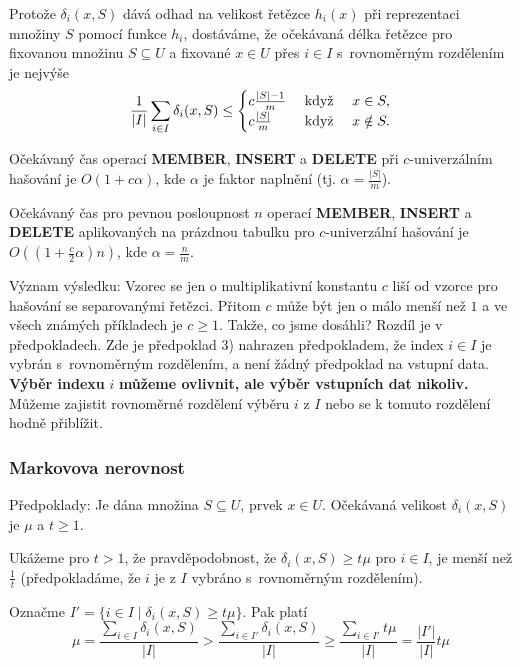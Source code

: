 \documentclass[a4paper,12pt]{article}
\begin{document}
Protože $\delta_i(x,S)$ dává odhad na velikost řetězce $
h_i(x)$ při 
repre\-zentaci množiny $S$ pomocí funkce $h_i$, dostáváme, že 
očekávaná délka řetězce pro fixovanou množinu  
$S\subseteq U$ a fixované $x\in U$ přes $i\in I$ s~rovnoměrným 
rozdělením je nejvýše
$$\frac 1{|I|}\sum_{i\in I}\delta_i(x,S)\le\begin{cases} c\frac {|S|-1}m&\text{\rm\ když }
\quad x\in S,\\
c\frac {|S|}m&\text{\rm\ když }\quad x\notin S.\end{cases} $$

\begin{veta}Očekávaný čas operací {\bf MEMBER}, {\bf INSERT }
a {\bf DE\-LETE} při $c$-univerzálním hašování je $
O(1+c\alpha )$, kde 
$\alpha$ je faktor napl\-nění (tj. $\alpha =\frac {|S|}m$).

Očekávaný čas pro pevnou posloupnost $n$ operací 
{\bf MEMBER}, {\bf INSERT} a {\bf DELETE} aplikovaných na prázdnou ta\-bulku 
pro $c$-univerzální hašování je $O((1+\frac c2\alpha 
)n)$, kde $\alpha =\frac nm$.  
\end{veta}

Význam výsledku:  Vzorec se jen o multiplikativní 
konstantu $c$ liší od vzorce pro hašování se separovanými 
řetězci.  Přitom $c$ může být jen o málo menší než $
1$ a 
ve všech známých příkla\-dech je $c\ge 1$.  Takže, co jsme 
dosáhli?  Rozdíl je v předpokla\-dech.  Zde je předpoklad 3) 
nahrazen předpokladem, že index $i\in I$ je vybrán s~rovnoměrným rozdělením, a není žádný předpoklad na vstupní 
data.  {\bf Výběr indexu} $i$ {\bf můžeme ov\-liv\-nit, ale výběr 
vstupních dat nikoliv.}  Můžeme zajistit rovno\-měr\-né 
rozdělení výběru $i$ z $I$ nebo se k tomuto rozdělení hodně 
přiblížit.  

\subsubsection{Markovova nerovnost}

Předpoklady: Je dána množina $S\subseteq U$, prvek $
x\in U$. 
Očeká\-va\-ná velikost $\delta_i(x,S)$ je $\mu$ a $t\ge 
1$.

Ukážeme pro $t>1$, že pravděpodobnost, že $
\delta_i(x,S)\ge t\mu$ 
pro $i\in I$, je menší než $\frac 1t$ (předpokladáme, že $
i$ je z $I$ vybráno s~rovnoměrným rozdělením).  

Označme $I'=\{i\in I\mid\delta_i(x,S)\ge t\mu \}$. Pak platí
$$\mu =\frac {\sum_{i\in I}\delta_i(x,S)}{|I|}>\frac {\sum_{i\in 
I'}\delta_i(x,S)}{|I|}\ge\frac {\sum_{i\in I'}t\mu}{|I|}=\frac {|
I'|}{|I|}t\mu$$
\end{document}
